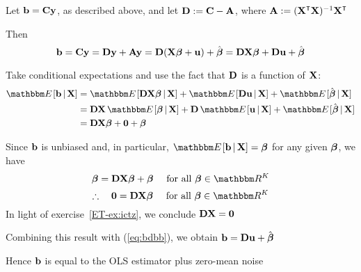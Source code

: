 \begin{frame}

    \vspace{2em}
    
    Let ${\mathbf b} = \mathbf C {\mathbf y}$, as described above, and let $\mathbf D :=
    \mathbf C - \mathbf A$, where $\boldA := (\boldX^\T\boldX)^{-1} \boldX^\T$
    
    \vspace{.7em}
    Then
    \begin{equation}
        \label{eq:bdbb}
        {\mathbf b} = \mathbf C {\mathbf y} = \mathbf D {\mathbf y} + \mathbf A {\mathbf y}
        = \mathbf D (\mathbf X {\boldsymbol \beta} + {\mathbf u}) + \hat {\boldsymbol \beta}
        = \mathbf D \mathbf X {\boldsymbol \beta} + \mathbf D {\mathbf u} + \hat {\boldsymbol \beta}
    \end{equation}
    
    \vspace{.7em}
    Take conditional expectations and use the fact that $\mathbf D$ is a
    function of $\mathbf X$:
    \begin{align*}
        \EE [ \boldb \given \boldX] 
        & = \EE[ \boldD \boldX \boldbeta \given \boldX]  + 
            \EE[ \boldD \boldu \given \boldX ] 
            + \EE[ \hboldbeta \given \boldX] 
            \\
        & = \boldD \boldX \, \EE[ \boldbeta \given \boldX]  + 
             \boldD  \,\EE[\boldu \given \boldX ] 
            + \EE[ \hboldbeta \given \boldX] 
            \\
        & = \boldD \boldX \boldbeta + \boldzero + \boldbeta
    \end{align*}

\end{frame}

\begin{frame}
    
    \vspace{2em}
    Since ${\mathbf b}$ is unbiased and, in particular,
    $\EE [ \boldb \given \boldX] = \boldbeta$ for any given ${\boldsymbol \beta}$,
    we have
    \begin{equation*}
        \boldbeta = \boldD \boldX \boldbeta + \boldbeta
        \quad \text{ for all } \boldbeta \in \RR^K
    \end{equation*}
    \begin{equation*}
        \fore
        \boldzero = \boldD \boldX \boldbeta 
        \quad \text{ for all } \boldbeta \in \RR^K
    \end{equation*}
    In light of exercise~\ref{ET-ex:ictz}, we conclude $\mathbf D \mathbf X = {\mathbf 0}$
    
    \vspace{.7em}
    Combining this result with
    (\ref{eq:bdbb}), we obtain ${\mathbf b} = \mathbf D {\mathbf u} + \hat {\boldsymbol \beta}$

    \vspace{.7em}    
    Hence
    ${\mathbf b}$ is equal to the OLS estimator plus zero-mean noise

\end{frame}

